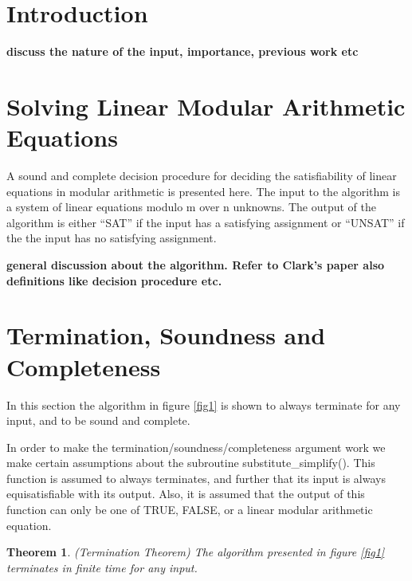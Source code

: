 \documentclass{article}
\newtheorem{theorem}{Theorem}[section]
\begin{document}
\section{Introduction}

\textbf{discuss the nature of the input, importance, previous work etc}

\section{Solving Linear Modular Arithmetic Equations}
A sound and complete decision procedure for deciding the
satisfiability of linear equations in modular arithmetic is presented
here. The input to the algorithm is a system of linear equations
modulo m over n unknowns. The output of the algorithm is either
``SAT'' if the input has a satisfying assignment or ``UNSAT'' if the
the input has no satisfying assignment.

\textbf{general discussion about the algorithm. Refer to Clark's paper
 also definitions like decision procedure etc.}

\section{Termination, Soundness and Completeness}
In this section the algorithm in figure \ref{fig1} is shown to always
terminate for any input, and to be sound and complete. 

In order to make the termination/soundness/completeness argument work
we make certain assumptions about the subroutine
substitute\_simplify(). This function is assumed to always terminates,
and further that its input is always equisatisfiable with its
output. Also, it is assumed that the output of this function can only
be one of TRUE, FALSE, or a linear modular arithmetic equation.

\begin{theorem}
\emph{(Termination Theorem)}
\label{Termination}
The algorithm presented in figure \ref{fig1} terminates in finite time
for any input.
\end{theorem}
\end{document}
